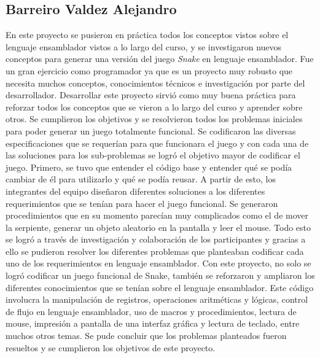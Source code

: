 \documentclass[12pt]{article}
\begin{document}
\subsection*{Barreiro Valdez Alejandro}
En este proyecto se pusieron en práctica todos los conceptos vistos sobre el lenguaje ensamblador vistos a lo largo del curso, y se investigaron nuevos conceptos para generar una versión del juego \textit{Snake} en lenguaje ensamblador. Fue un gran ejercicio como programador ya que es un proyecto muy robusto que necesita muchos conceptos, conocimientos técnicos e investigación por parte del desarrollador. Desarrollar este proyecto sirvió como muy buena práctica para reforzar todos los conceptos que se vieron a lo largo del curso y aprender sobre otros. Se cumplieron los objetivos y se resolvieron todos los problemas iniciales para poder generar un juego totalmente funcional. Se codificaron las diversas especificaciones que se requerían para que funcionara el juego y con cada una de las soluciones para los sub-problemas se logró el objetivo mayor de codificar el juego. Primero, se tuvo que entender el código base y entender qué se podía cambiar de él para utilizarlo y qué se podía reusar. A partir de esto, los integrantes del equipo diseñaron diferentes soluciones a los diferentes requerimientos que se tenían para hacer el juego funcional. Se generaron procedimientos que en su momento parecían muy complicados como el de mover la serpiente, generar un objeto aleatorio en la pantalla y leer el mouse. Todo esto se logró a través de investigación y colaboración de los participantes y gracias a ello se pudieron resolver los diferentes problemas que planteaban codificar cada uno de los requerimientos en lenguaje ensamblador. Con este proyecto, no solo se logró codificar un juego funcional de Snake, también se reforzaron y ampliaron los diferentes conocimientos que se tenían sobre el lenguaje ensamblador. Este código involucra la manipulación de registros, operaciones aritméticas y lógicas, control de flujo en lenguaje ensamblador, uso de macros y procedimientos, lectura de mouse, impresión a pantalla de una interfaz gráfica y lectura de teclado, entre muchos otros temas. Se pude concluir que los problemas planteados fueron resueltos y se cumplieron los objetivos de este proyecto.
\end{document}
